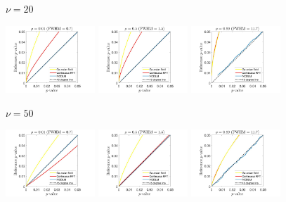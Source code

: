 \documentclass{article}
\begin{document}
\begin{figure}[!htp]
\centering
\begin{sideways}
\phantom{------------------}$\nu = 20$
\end{sideways}
\includegraphics[trim=70 5 100 5, clip,width=0.3\textwidth]{figure/3D_nu20_rho0.01.jpg}
\includegraphics[trim=70 5 100 5, clip,width=0.3\textwidth]{figure/3D_nu20_rho0.5.jpg}
\includegraphics[trim=70 5 100 5, clip,width=0.3\textwidth]{figure/3D_nu20_rho0.99.jpg}

\begin{sideways}
\phantom{------------------}$\nu = 50$
\end{sideways}
\includegraphics[trim=70 5 100 5, clip,width=0.3\textwidth]{figure/3D_nu50_rho0.01.jpg}
\includegraphics[trim=70 5 100 5, clip,width=0.3\textwidth]{figure/3D_nu50_rho0.5.jpg}
\includegraphics[trim=70 5 100 5, clip,width=0.3\textwidth]{figure/3D_nu50_rho0.99.jpg}


\end{figure}
\end{document}
